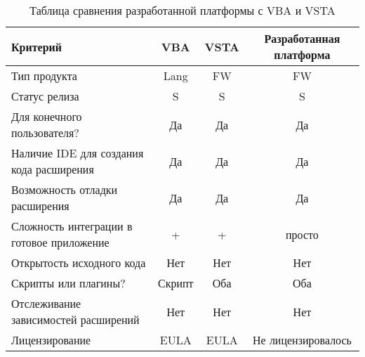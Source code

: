 \begin{table}[H]
  \caption{Таблица сравнения разработанной платформы с VBA и VSTA}
  \label{tabular:res_compare_tab}
  \begin{center}
  \begin{tabular}{|p{4.5cm}|c|c|c|}
  
    \hline
      Критерий &
      VBA &
      VSTA &
      Разработанная платформа \\
    \hline
      Тип продукта &
      Lang &
      FW &
      FW \\
    \hline
      Статус релиза &
      S &
      S &
      S \\
    \hline
      Для конечного пользователя? &
      Да &
      Да &
      Да \\
    \hline
      Наличие IDE для создания кода расширения &
      Да &
      Да &
      Да \\
    \hline
      Возможность отладки расширения &
      Да &
      Да &
      Да \\
    \hline
      Сложность интеграции в готовое приложение &
      + &
      + &
      просто \\
    \hline
      Открытость исходного кода &
      Нет &
      Нет &
      Нет \\
    \hline
      Скрипты или плагины? &
      Скрипт &
      Оба &
      Оба \\
    \hline
      Отслеживание зависимостей расширений &
      Нет &
      Нет &
      Нет \\
    \hline
      Лицензирование &
      EULA &
      EULA &
      Не лицензировалось \\
    \hline
    
  \end{tabular}
  \end{center}
\end{table}